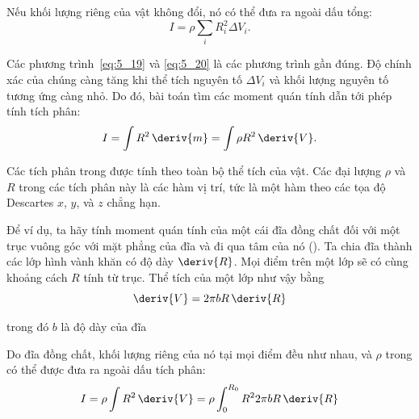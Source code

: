 \noindent
Nếu khối lượng riêng của vật không đổi, nó có thể đưa ra ngoài dấu tổng:
\begin{equation}\label{eq:5_20}
I = \rho \sum_i R_i^2 \Delta V_i.
\end{equation}

Các phương trình~\eqref{eq:5_19} và \eqref{eq:5_20} là các phương trình gần đúng. Độ chính xác của chúng càng tăng khi thể tích nguyên tố $\Delta V_i$ và khối lượng nguyên tố tương ứng càng nhỏ. Do đó, bài toán tìm các moment quán tính dẫn tới phép tính tích phân:
\begin{equation}\label{eq:5_21}
I = \int R^2\, \deriv{m} = \int \rho R^2\, \deriv{V}.
\end{equation}

\noindent
Các tích phân trong  được tính theo toàn bộ thể tích của vật. Các đại lượng $\rho$ và $R$ trong các tích phân này là các hàm vị trí, tức là một hàm theo các tọa độ Descartes $x$, $y$, và $z$ chẳng hạn.

Để ví dụ, ta hãy tính moment quán tính của một cái đĩa đồng chất đối với một trục vuông góc với mặt phẳng của đĩa và đi qua tâm của nó (). Ta chia đĩa thành các lớp hình vành khăn có độ dày $\deriv{R}$. Mọi điểm trên một lớp sẽ có cùng khoảng cách $R$ tính từ trục. Thể tích của một lớp như vậy bằng
\begin{equation*}
\deriv{V} = 2\pi bR\,\deriv{R}
\end{equation*}

\noindent
trong đó $b$ là độ dày của đĩa

Do đĩa đồng chất, khối lượng riêng của nó tại mọi điểm đều như nhau, và $\rho$ trong  có thể được đưa ra ngoài dấu tích phân:
\begin{equation*}
I = \rho \int R^2\,\deriv{V} = \rho \int_0^{R_0} R^2 2\pi bR\,\deriv{R}
\end{equation*}

